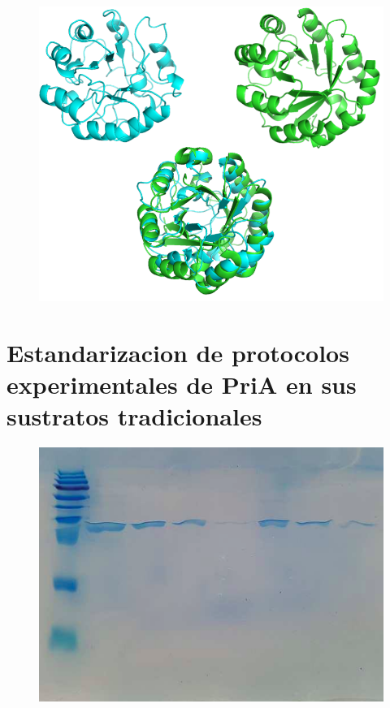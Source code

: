\documentclass[12pt,twoside]{reedthesis}
\begin{document}
  \begin{figure}[h!tbp]
  \centering
  \includegraphics[angle = 0,scale = 1]{chapter4/Couplings/PriACouplingFoldings.png}
  \caption[Superposición de estructura de PriA generado por Folding con la estructura cristalográfica]{\footnotesize{}}
  \label{fig:CouplingsFoldingPriA}
  \end{figure}
  
  \section{Estandarizacion de protocolos experimentales de PriA en sus
  sustratos
  tradicionales}\label{estandarizacion-de-protocolos-experimentales-de-pria-en-sus-sustratos-tradicionales}
  
  \begin{figure}[h!tbp]
  \centering
  \includegraphics[angle = 0,scale = 0.6]{chapter4/Geles/PriAAbril30.png}
  \caption[gel]{\footnotesize{}}
  \label{fig:gel}
  \end{figure}
  
\end{document}
